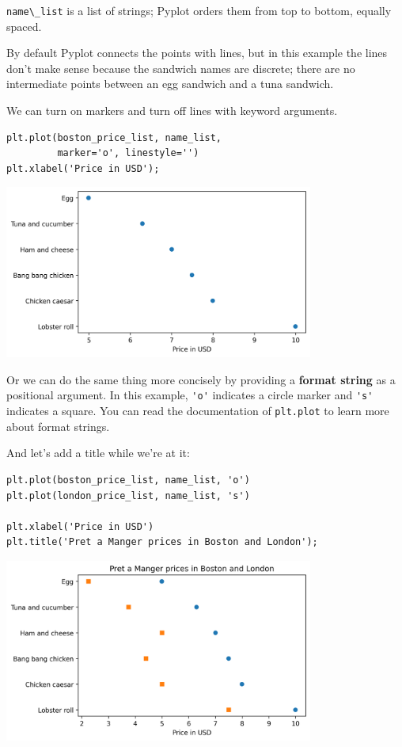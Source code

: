 \passthrough{\lstinline!name\_list!} is a list of strings; Pyplot orders
them from top to bottom, equally spaced.

By default Pyplot connects the points with lines, but in this example
the lines don't make sense because the sandwich names are discrete;
there are no intermediate points between an egg sandwich and a tuna
sandwich.

We can turn on markers and turn off lines with keyword arguments.

\begin{lstlisting}[]
plt.plot(boston_price_list, name_list, 
         marker='o', linestyle='')
plt.xlabel('Price in USD');
\end{lstlisting}

\begin{center}
\includegraphics[width=4in]{chapters/06_plotting_files/06_plotting_40_0.png}
\end{center}

Or we can do the same thing more concisely by providing a \textbf{format
string} as a positional argument. In this example,
\passthrough{\lstinline!'o'!} indicates a circle marker and
\passthrough{\lstinline!'s'!} indicates a square. You can read the
documentation of \passthrough{\lstinline!plt.plot!} to learn more about
format strings.

And let's add a title while we're at it:

\begin{lstlisting}[]
plt.plot(boston_price_list, name_list, 'o')
plt.plot(london_price_list, name_list, 's')

plt.xlabel('Price in USD')
plt.title('Pret a Manger prices in Boston and London');
\end{lstlisting}

\begin{center}
\includegraphics[width=4in]{chapters/06_plotting_files/06_plotting_42_0.png}
\end{center}

